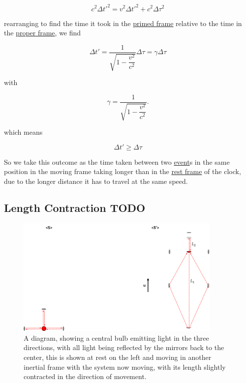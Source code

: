 \begin{equation}
	c^2 \Delta t'^2 = v^2 \Delta t'^2 + c^2\Delta \tau^2
\end{equation}

rearranging to find the time it took in the \hyperlink{def-Primed-Frame}{primed frame} relative to the time in the \hyperlink{def-proper-frame}{proper frame}, we find

\begin{equation}
	\Delta t' = \dfrac{1}{\sqrt{1-\dfrac{v^2}{c^2}}} \Delta \tau = \gamma \Delta \tau
\end{equation}

with

\begin{equation}
	\gamma = \dfrac{1}{\sqrt{1-\dfrac{v^2}{c^2}}}.
\end{equation}

which means

\begin{equation}
	\Delta t' \geq \Delta \tau
\end{equation}

So we take this outcome as the time taken between two \hyperlink{def-event}{event}s in the same position in the moving frame taking longer than in the \hyperlink{def-proper-frame}{rest frame} of the clock, due to the longer distance it has to travel at the same speed.

\subsection{Length Contraction TODO}

\begin{figure}[H]
	\centering
	\includegraphics[width=10cm]{images/pdf/Length_Contraction.pdf}
	\caption{A diagram, showing a central bulb emitting light in the three directions, with all light being reflected by the mirrors back to the center, this is shown at rest on the left and moving in another inertial frame with the system now moving, with its length slightly contracted in the direction of movement.}
	\label{fig: length contraction math}
\end{figure}

